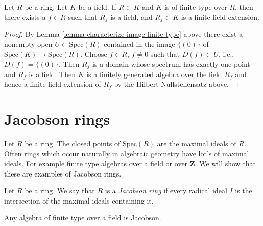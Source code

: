 \begin{lemma}
\label{lemma-field-finite-type-over-domain}
Let $R$ be a ring. Let $K$ be a field.
If $R \subset K$ and $K$ is of finite type over $R$,
then there exists a $f \in R$ such that $R_f$ is a field,
and $R_f \subset K$ is a finite field extension.
\end{lemma}

\begin{proof}
By Lemma \ref{lemma-characterize-image-finite-type} above there
exist a nonempty open $U \subset \text{Spec}(R)$
contained in the image $\{(0)\}$ of $\text{Spec}(K) \to \text{Spec}(R)$.
Choose $f \in R$, $f \not = 0$ such that $D(f) \subset U$, i.e.,
$D(f) = \{(0)\}$. Then $R_f$ is a domain whose spectrum has exactly one
point and $R_f$ is a field. Then $K$ is a finitely generated algebra
over the field $R_f$ and hence a finite field extension of
$R_f$ by the Hilbert Nullstellensatz above.
\end{proof}





















\section{Jacobson rings}
\label{section-ring-jacobson}

\noindent
Let $R$ be a ring. The closed points of $\text{Spec}(R)$ are the
maximal ideals of $R$. Often rings which occur naturally in algebraic
geometry have lot's of maximal ideals. For example finite type algebras
over a field or over $\mathbf{Z}$. We will show that these
are examples of Jacobson rings.

\begin{definition}
\label{definition-ring-jacobson}
Let $R$ be a ring. We say that $R$ is a
{\it Jacobson ring} if every radical
ideal $I$ is the intersection of the
maximal ideals containing it.
\end{definition}

\begin{lemma}
\label{lemma-finite-type-field-Jacobson}
Any algebra of finite type over a field is Jacobson.
\end{lemma}

